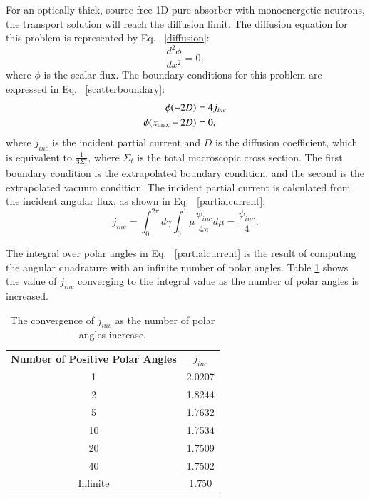 \documentclass{anstrans}
\begin{document}
For an optically thick, source free 1D pure absorber with monoenergetic neutrons, the transport solution will reach the diffusion limit. The diffusion equation for this problem is represented by Eq. ~\eqref{diffusion}:
\begin{equation}
\frac{d^2\phi}{dx^2} = 0,
\label{diffusion}
\end{equation}
where $\phi$ is the scalar flux. The boundary conditions for this problem are expressed in Eq. ~\eqref{scatterboundary}:
\begin{align}
\phi(-2D) &= 4j_{inc} \notag \\
\phi(x_{\text{max}}+2D) &= 0, 
\label{scatterboundary}
\end{align}
where $j_{inc}$ is the incident partial current and $D$ is the diffusion coefficient, which is equivalent to $\frac{1}{3 \Sigma_t}$, where $\Sigma_t$ is the total macroscopic cross section. The first boundary condition is the extrapolated boundary condition, and the second is the extrapolated vacuum condition. The incident partial current is calculated from the incident angular flux, as shown in Eq. ~\eqref{partialcurrent}:
\begin{equation}
j_{inc} = \int_{0}^{2\pi}d\gamma \int_{0}^{1} \mu \frac{\psi_{inc}}{4\pi} d\mu = \frac{\psi_{inc}}{4}.
\label{partialcurrent}
\end{equation}

The integral over polar angles in Eq. ~\eqref{partialcurrent} is the result of computing the angular quadrature with an infinite number of polar angles. Table \ref{angleconvergence} shows the value of $j_{inc}$ converging to the integral value as the number of polar angles is increased. 
\begin{table}[H]
\centering
\caption{The convergence of $j_{inc}$ as the number of polar angles increase.}
\begin{tabular}{c c}
\hline
\textbf{Number of Positive Polar Angles} & \textbf{$j_{inc}$} \\
1 & 2.0207 \\
2 & 1.8244 \\
5 & 1.7632 \\
10 & 1.7534 \\
20 & 1.7509 \\
40 & 1.7502 \\
Infinite & 1.750 \\
\hline
\end{tabular}
\label{angleconvergence}
\end{table}
\end{document}
